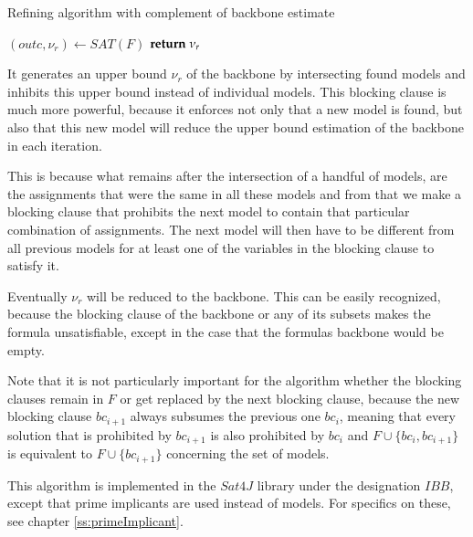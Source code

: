 \begin{algorithm}
\caption{{\sc Refining algorithm with complement of backbone estimate}}
\label{alg:ibb}
\DontPrintSemicolon
{}
$(outc,\nu_r) \gets SAT(F)$\;
$\Return \; \nu_r$\;
\end{algorithm}

It generates an upper bound $\nu_r$ of the backbone by intersecting found models and inhibits this upper bound instead of individual models. This blocking clause is much more powerful, because it enforces not only that a new model is found, but also that this new model will reduce the upper bound estimation of the backbone in each iteration. 

This is because what remains after the intersection of a handful of models, are the assignments that were the same in all these models and from that we make a blocking clause that prohibits the next model to contain that particular combination of assignments. The next model will then have to be different from all previous models for at least one of the variables in the blocking clause to satisfy it.

Eventually $\nu_r$ will be reduced to the backbone. This can be easily recognized, because the blocking clause of the backbone or any of its subsets makes the formula unsatisfiable, except in the case that the formulas backbone would be empty. 

Note that it is not particularly important for the algorithm whether the blocking clauses remain in $F$ or get replaced by the next blocking clause, because the new blocking clause $bc_{i+1}$ always subsumes the previous one $bc_i$, meaning that every solution that is prohibited by $bc_{i+1}$ is also prohibited by $bc_i$ and $F \cup \{bc_i , bc_{i+1}\}$ is equivalent to $F \cup \{bc_{i+1}\}$ concerning the set of models.

This algorithm is implemented in the $Sat4J$ library under the designation $IBB$, except that prime implicants are used instead of models. For specifics on these, see chapter \ref{ss:primeImplicant}. 


